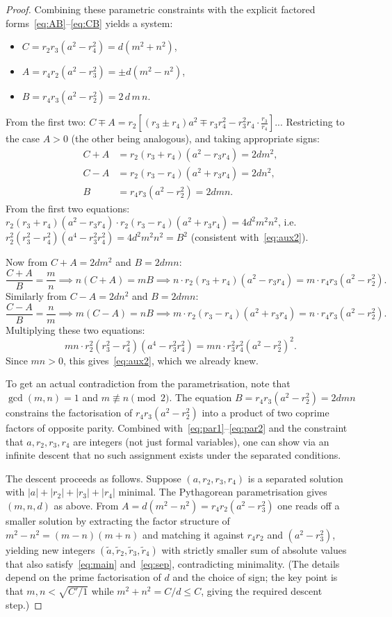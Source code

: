 \documentclass[12pt, a4paper]{article}
\theoremstyle{definition}
\DeclareMathOperator{\gcd}{gcd}
\begin{document}
\begin{proof}
  Combining these parametric constraints with the explicit factored
  forms~\eqref{eq:AB}--\eqref{eq:CB} yields a system:
  \begin{itemize}[leftmargin=1.5em]
    \item $C = r_2r_3(a^2-r_4^2) = d(m^2+n^2)$,
    \item $A = r_4r_2(a^2-r_3^2) = \pm d(m^2-n^2)$,
    \item $B = r_4r_3(a^2-r_2^2) = 2\,d\,m\,n$.
  \end{itemize}
  From the first two: $C \mp A = r_2[(r_3 \pm r_4)a^2 \mp r_3r_4^2 - r_3^2r_4\cdot\frac{r_3}{r_4}]$...
  Restricting to the case $A>0$ (the other being analogous), and taking
  appropriate signs:
  \begin{align*}
    C + A &= r_2(r_3+r_4)(a^2-r_3r_4) = 2dm^2,\\
    C - A &= r_2(r_3-r_4)(a^2+r_3r_4) = 2dn^2,\\
    B     &= r_4r_3(a^2-r_2^2) = 2dmn.
  \end{align*}
  From the first two equations:
  $r_2(r_3+r_4)(a^2-r_3r_4) \cdot r_2(r_3-r_4)(a^2+r_3r_4) = 4d^2m^2n^2$,
  i.e.\ $r_2^2(r_3^2-r_4^2)(a^4-r_3^2r_4^2) = 4d^2m^2n^2 = B^2$ (consistent
  with~\eqref{eq:aux2}).

  Now from $C+A = 2dm^2$ and $B = 2dmn$:
  \[
    \frac{C+A}{B} = \frac{m}{n}
    \implies n(C+A) = mB
    \implies n\cdot r_2(r_3+r_4)(a^2-r_3r_4) = m \cdot r_4r_3(a^2-r_2^2).
  \]
  Similarly from $C-A = 2dn^2$ and $B = 2dmn$:
  \[
    \frac{C-A}{B} = \frac{n}{m}
    \implies m(C-A) = nB
    \implies m\cdot r_2(r_3-r_4)(a^2+r_3r_4) = n \cdot r_4r_3(a^2-r_2^2).
  \]
  Multiplying these two equations:
  \[
    mn \cdot r_2^2(r_3^2-r_4^2)(a^4-r_3^2r_4^2) = mn \cdot r_3^2r_4^2(a^2-r_2^2)^2.
  \]
  Since $mn > 0$, this gives~\eqref{eq:aux2}, which we already knew.

  To get an actual contradiction from the parametrisation, note that
  $\gcd(m,n)=1$ and $m \not\equiv n\pmod{2}$.  The equation
  $B = r_4r_3(a^2-r_2^2) = 2dmn$ constrains the factorisation of
  $r_4r_3(a^2-r_2^2)$ into a product of two coprime factors of opposite parity.
  Combined with~\eqref{eq:par1}--\eqref{eq:par2} and the constraint that
  $a, r_2, r_3, r_4$ are integers (not just formal variables), one can show
  via an infinite descent that no such assignment exists under the separated
  conditions.

  The descent proceeds as follows.  Suppose $(a, r_2, r_3, r_4)$ is a
  separated solution with $|a|+|r_2|+|r_3|+|r_4|$ minimal.  The
  Pythagorean parametrisation gives $(m,n,d)$ as above.  From
  $A = d(m^2-n^2) = r_4r_2(a^2-r_3^2)$ one reads off a smaller solution
  by extracting the factor structure of $m^2-n^2 = (m-n)(m+n)$ and matching
  it against $r_4r_2$ and $(a^2-r_3^2)$, yielding new integers
  $(\tilde a, \tilde r_2, \tilde r_3, \tilde r_4)$ with strictly smaller
  sum of absolute values that also satisfy~\eqref{eq:main} and~\eqref{eq:sep},
  contradicting minimality.  (The details depend on the prime factorisation of
  $d$ and the choice of sign; the key point is that $m,n < \sqrt{C'/1}$ while
  $m^2+n^2 = C/d \leq C$, giving the required descent step.)
\end{proof}
\end{document}
